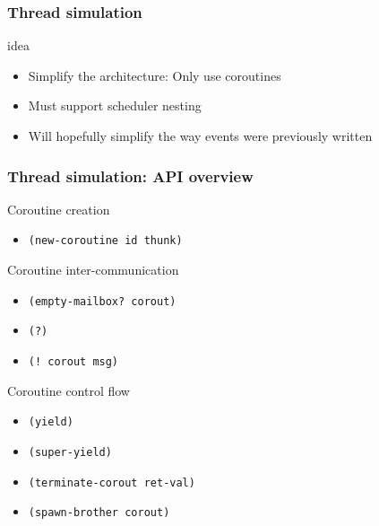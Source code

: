 \documentclass{beamer}
\newcommand{\<}[1]{\`#1}
\begin{document}
\begin{frame}
  \frametitle{Thread simulation}

  \begin{block}{idea}
    \begin{itemize}
    \item Simplify the architecture: Only use coroutines
    \item Must support scheduler \alert{nesting}
    \item Will hopefully simplify the way events were previously written
    \end{itemize}
  \end{block}
\end{frame}

\begin{frame}
  \frametitle{Thread simulation: API overview}
  \begin{block}{Coroutine creation}
    \begin{itemize}
    \item \texttt{(new-coroutine id thunk)}
    \end{itemize}
  \end{block}

  \begin{block}{Coroutine inter-communication}
    \begin{itemize}
    \item \texttt{(empty-mailbox? corout)}
    \item \texttt{(?)}
    \item \texttt{(! corout msg)}
    \end{itemize}
  \end{block}

  \begin{block}{Coroutine control flow}
    \begin{itemize}
    \item \texttt{(yield)}
    \item \texttt{(super-yield)}
    \item \texttt{(terminate-corout ret-val)}
    \item \texttt{(spawn-brother corout)}
    \end{itemize}
  \end{block}

\end{frame}
\end{document}
